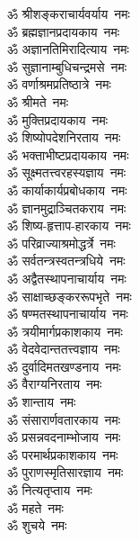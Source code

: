 \begin{multicols}{2}
    \begin{flushleft}
        ॐ श्रीशङ्कराचार्यवर्याय~नमः\\
        ॐ ब्रह्मज्ञानप्रदायकाय~नमः\\
        ॐ अज्ञानतिमिरादित्याय~नमः\\
        ॐ सुज्ञानाम्बुधिचन्द्रमसे~नमः\\
        ॐ वर्णाश्रमप्रतिष्ठात्रे~नमः\\
        ॐ श्रीमते~नमः\\
        ॐ मुक्तिप्रदायकाय~नमः\\
        ॐ शिष्योपदेशनिरताय~नमः\\
        ॐ भक्ताभीष्टप्रदायकाय~नमः\\
        ॐ सूक्ष्मतत्त्व\-रहस्यज्ञाय~नमः\\
                                        
        ॐ कार्याकार्यप्रबोधकाय~नमः\\
        ॐ ज्ञानमुद्राञ्चितकराय~नमः\\
        ॐ शिष्य-हृत्ताप-हारकाय~नमः\\
        ॐ परिव्राज्याश्रमोद्धर्त्रे~नमः\\
        ॐ सर्वतन्त्रस्वतन्त्रधिये~नमः\\
        ॐ अद्वैतस्थापनाचार्याय~नमः\\
        ॐ साक्षाच्छङ्कररूपभृते~नमः\\
        ॐ षण्मतस्थापनाचार्याय~नमः\\
        ॐ त्रयीमार्गप्रकाशकाय~नमः\\
        ॐ वेदवेदान्ततत्त्वज्ञाय~नमः\hfill{}\\
                                        
        ॐ दुर्वादिमतखण्डनाय~नमः\\
        ॐ वैराग्यनिरताय~नमः\\
        ॐ शान्ताय~नमः\\
        ॐ संसारार्णवतारकाय~नमः\\
        ॐ प्रसन्नवदनाम्भोजाय~नमः\\
        ॐ परमार्थप्रकाशकाय~नमः\\
        ॐ पुराणस्मृतिसारज्ञाय~नमः\\
        ॐ नित्यतृप्ताय~नमः\\
        ॐ महते~नमः\\
        ॐ शुचये~नमः\hfill{}\\
                                        

\end{flushleft}
\end{multicols}
